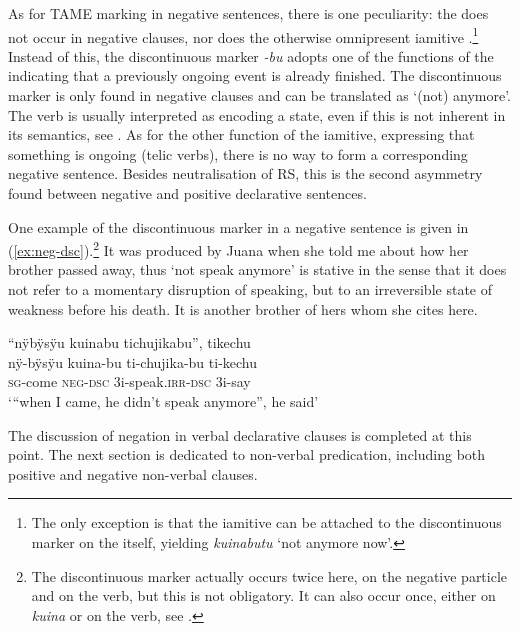 As for TAME marking in negative sentences, there is one peculiarity: the  does not occur in negative clauses, nor does the otherwise omnipres\-ent iamitive .\footnote{The only exception is that the iamitive can be attached to the discontinuous marker on the  itself, yielding \textit{kuinabutu} ‘not anymore now’.} Instead of this, the \isi{}discontinuous marker \textit{-bu} adopts one of the functions of the  indicating that a previously ongoing event is already finished. The discontinuous marker is only found in negative clauses and can be translated as ‘(not) anymore’. The verb is usually interpreted as encoding a state, even if this is not inherent in its semantics, see . As for the other function of the iamitive, expressing that something is ongoing (telic verbs), there is no way to form a corresponding negative sentence. Besides neutralisation of RS, this is the second asymmetry found between negative and positive declarative sentences.

One example of the discontinuous marker in a negative sentence is given in (\ref{ex:neg-dsc}).\footnote{The discontinuous marker actually occurs twice here, on the negative particle and on the verb, but this is not obligatory. It can also occur once, either on \textit{kuina} or on the verb, see .} It was produced by Juana when she told me about how her brother passed away, thus ‘not speak anymore’ is stative in the sense that it does not refer to a momentary disruption of speaking, but to an irreversible state of weakness before his death. It is another brother of hers whom she cites here.

\ea\label{ex:neg-dsc}
\begingl
\glpreamble “nÿbÿsÿu kuinabu tichujikabu”, tikechu\\
\gla nÿ-bÿsÿu kuina-bu ti-chujika-bu ti-kechu\\
\textsc{sg}-come \textsc{neg}-\textsc{dsc} 3i-speak.\textsc{irr}-\textsc{dsc} 3i-say\\
\glft ‘“when I came, he didn’t speak anymore”, he said’
\endgl
\trailingcitation{[jxx-p120430l-2.456]}
\xe
{}

The discussion of negation in verbal declarative clauses is completed at this point. The next section is dedicated to non-verbal predication, including both positive and negative non-verbal clauses. 



